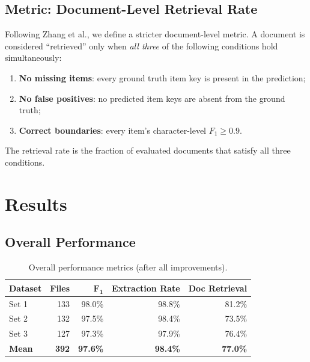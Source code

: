 \documentclass[11pt,a4paper]{article}
\begin{document}
\subsection{Metric: Document-Level Retrieval Rate}

Following Zhang et al., we define a stricter document-level metric. A document is considered ``retrieved'' only when \emph{all three} of the following conditions hold simultaneously:
\begin{enumerate}[nosep]
    \item \textbf{No missing items}: every ground truth item key is present in the prediction;
    \item \textbf{No false positives}: no predicted item keys are absent from the ground truth;
    \item \textbf{Correct boundaries}: every item's character-level $F_1 \geq 0.9$.
\end{enumerate}

\noindent
The retrieval rate is the fraction of evaluated documents that satisfy all three conditions.


\section{Results}\label{sec:results}

\subsection{Overall Performance}

\begin{table}[H]
\centering
\caption{Overall performance metrics (after all improvements).}
\label{tab:overall}
\begin{tabular}{lrrrr}
\toprule
\textbf{Dataset} & \textbf{Files} & $\boldsymbol{F_1}$ & \textbf{Extraction Rate} & \textbf{Doc Retrieval}\\
\midrule
Set 1 & 133 & 98.0\% & 98.8\% & 81.2\%\\
Set 2 & 132 & 97.5\% & 98.4\% & 73.5\%\\
Set 3 & 127 & 97.3\% & 97.9\% & 76.4\%\\
\midrule
\textbf{Mean} & \textbf{392} & \textbf{97.6\%} & \textbf{98.4\%} & \textbf{77.0\%}\\
\bottomrule
\end{tabular}
\end{table}
\end{document}
